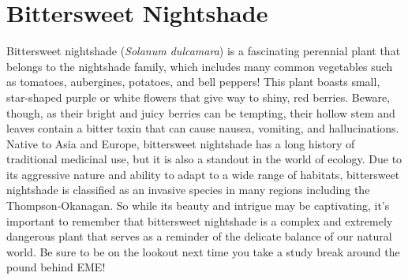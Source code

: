 \documentclass[
]{book}
\begin{document}
\hypertarget{bittersweet-nightshade}{%
\section{Bittersweet Nightshade}\label{bittersweet-nightshade}}

Bittersweet nightshade (\emph{Solanum dulcamara}) is a fascinating perennial plant that belongs to the nightshade family, which includes many common vegetables such as tomatoes, aubergines, potatoes, and bell peppers! This plant boasts small, star-shaped purple or white flowers that give way to shiny, red berries. Beware, though, as their bright and juicy berries can be tempting, their hollow stem and leaves contain a bitter toxin that can cause nausea, vomiting, and hallucinations. Native to Asia and Europe, bittersweet nightshade has a long history of traditional medicinal use, but it is also a standout in the world of ecology. Due to its aggressive nature and ability to adapt to a wide range of habitats, bittersweet nightshade is classified as an invasive species in many regions including the Thompson-Okanagan. So while its beauty and intrigue may be captivating, it's important to remember that bittersweet nightshade is a complex and extremely dangerous plant that serves as a reminder of the delicate balance of our natural world. Be sure to be on the lookout next time you take a study break around the pound behind EME!
\end{document}
